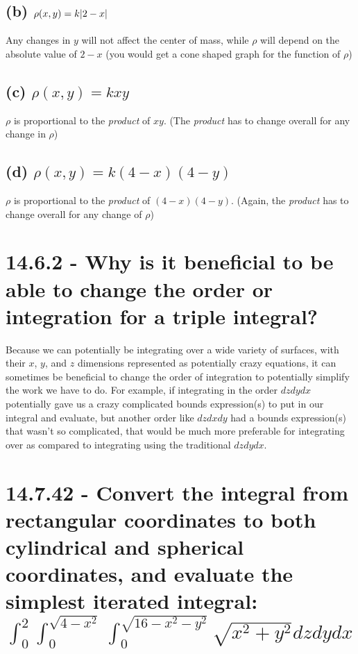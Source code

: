 \documentclass{article}
\begin{document}
\subsection{(b) $\rho(x, y) = k\abs{2 - x}$}
\par\noindent\large Any changes in $y$ will not affect the center of mass, while $\rho$ will depend on the absolute value of $2 - x$ (you would get a cone shaped graph for the function of $\rho$)

\subsection{(c) $\rho(x, y) = kxy$}
\par\noindent\large $\rho$ is proportional to the \textit{product} of $xy$. (The \textit{product} has to change overall for any change in $\rho$)

\subsection{(d) $\rho(x, y) = k(4 - x)(4 - y)$}
\par\noindent\large $\rho$ is proportional to the \textit{product} of $(4 - x)(4 - y)$. (Again, the \textit{product} has to change overall for any change of $\rho$)

\section{14.6.2 - Why is it beneficial to be able to change the order or integration for a triple integral?}
\par\noindent\large Because we can potentially be integrating over a wide variety of surfaces, with their $x$, $y$, and $z$ dimensions represented as potentially crazy equations, it can sometimes be beneficial to change the order of integration to potentially simplify the work we have to do.  For example, if integrating in the order $dzdydx$ potentially gave us a crazy complicated bounds expression(s) to put in our integral and evaluate, but another order  like $dzdxdy$ had a bounds expression(s) that wasn't so complicated, that would be much more preferable for integrating over as compared to integrating using the traditional $dzdydx$.

\section{14.7.42 - Convert the integral from rectangular coordinates to both cylindrical and spherical coordinates, and evaluate the simplest iterated integral: $\int_{0}^{2}\int_{0}^{\sqrt{4 - x^{2}}}\int_{0}^{\sqrt{16 - x^{2} - y^{2}}}\sqrt{x^{2} + y^{2}} dzdydx$}
\end{document}
